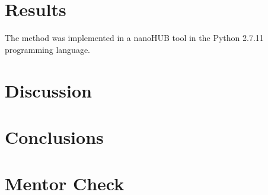 \documentclass{article}
\begin{document}
\section{Results}

The method was implemented in a nanoHUB tool in the Python 2.7.11 programming language. 

\section{Discussion}

\section{Conclusions}




\section{Mentor Check}
\end{document}
